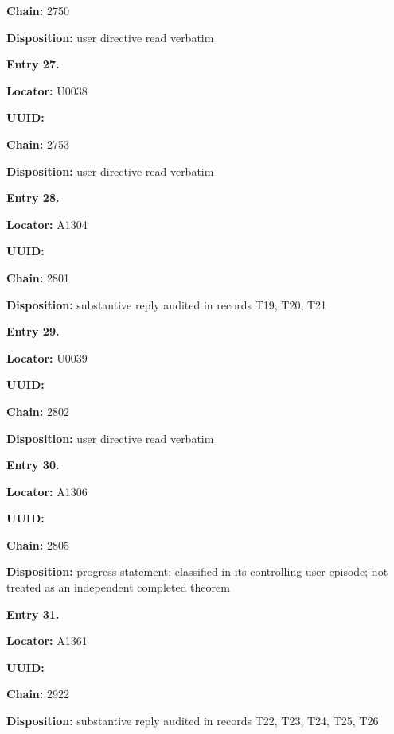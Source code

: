 \textbf{Chain:} 2750

\textbf{Disposition:} user directive read verbatim


\textbf{Entry 27.}

\textbf{Locator:} U0038

\textbf{UUID:} \protect{}

\textbf{Chain:} 2753

\textbf{Disposition:} user directive read verbatim


\textbf{Entry 28.}

\textbf{Locator:} A1304

\textbf{UUID:} \protect{}

\textbf{Chain:} 2801

\textbf{Disposition:} substantive reply audited in records T19, T20, T21


\textbf{Entry 29.}

\textbf{Locator:} U0039

\textbf{UUID:} \protect{}

\textbf{Chain:} 2802

\textbf{Disposition:} user directive read verbatim


\textbf{Entry 30.}

\textbf{Locator:} A1306

\textbf{UUID:} \protect{}

\textbf{Chain:} 2805

\textbf{Disposition:} progress statement; classified in its controlling
user episode; not treated as an independent completed theorem


\textbf{Entry 31.}

\textbf{Locator:} A1361

\textbf{UUID:} \protect{}

\textbf{Chain:} 2922

\textbf{Disposition:} substantive reply audited in records T22, T23,
T24, T25, T26


